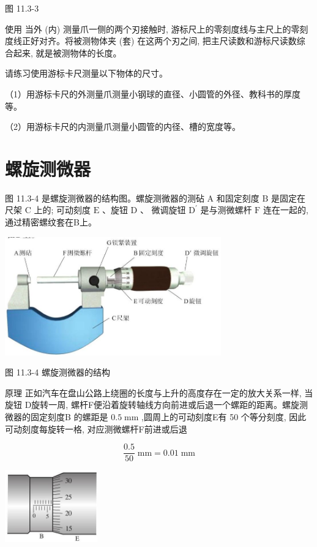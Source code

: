 \documentclass[10pt]{article}
\begin{document}
图 11.3-3

使用 当外 (内) 测量爪一侧的两个刃接触时, 游标尺上的零刻度线与主尺上的零刻度线正好对齐。将被测物体夹 (套) 在这两个刃之间, 把主尺读数和游标尺读数综合起来, 就是被测物体的长度。

请练习使用游标卡尺测量以下物体的尺寸。

（1）用游标卡尺的外测量爪测量小钢球的直径、小圆管的外径、教科书的厚度等。

（2）用游标卡尺的内测量爪测量小圆管的内径、槽的宽度等。

\section*{螺旋测微器}

图 11.3-4 是螺旋测微器的结构图。螺旋测微器的测砧 A 和固定刻度 \(\mathrm{B}\) 是固定在尺架 \(\mathrm{C}\) 上的; 可动刻度 \(\mathrm{E}\) 、旋钮 \(\mathrm{D}\) 、 微调旋钮 \({\mathrm{D}}^{\prime }\) 是与测微螺杆 \(\mathrm{F}\) 连在一起的,通过精密螺纹套在B上。

\begin{center}
\includegraphics[max width=0.7\textwidth]{images/01911d5f-8e38-70c0-b5b8-2b399bd115b6_69_562055.jpg}
\end{center}

图 11.3-4 螺旋测微器的结构

原理 正如汽车在盘山公路上绕圈的长度与上升的高度存在一定的放大关系一样, 当旋钮 D旋转一周, 螺杆F便沿着旋转轴线方向前进或后退一个螺距的距离。螺旋测微器的固定刻度B 的螺距是 \({0.5}\mathrm{\;{mm}}\) ,圆周上的可动刻度E有 50 个等分刻度, 因此可动刻度每旋转一格, 对应测微螺杆F前进或后退

\[
\frac{0.5}{50}\mathrm{\;{mm}} = {0.01}\mathrm{\;{mm}}
\]

\begin{center}
\includegraphics[max width=0.3\textwidth]{images/01911d5f-8e38-70c0-b5b8-2b399bd115b6_69_805950.jpg}
\end{center}
\end{document}
